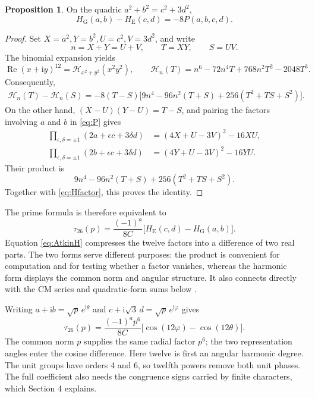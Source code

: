 \documentclass[a4paper,11pt]{article}
\theoremstyle{definition}
\newtheorem{proposition}{Proposition}[section]
\DeclareMathOperator{\Repart}{Re}
\newcommand{\iu}{\mathrm i}
\begin{document}
\begin{proposition}\label{prop:harmonic}
On the quadric \(a^2+b^2=c^2+3d^2\),
\begin{equation}\label{eq:harmonicidentity}
 H_{\mathrm G}(a,b)-H_{\mathrm E}(c,d)=-8P(a,b,c,d).
\end{equation}
\end{proposition}
\begin{proof}
Set \(X=a^2,Y=b^2,U=c^2,V=3d^2\), and write
\[
 n=X+Y=U+V,\qquad T=XY,\qquad S=UV.
\]
The binomial expansion yields
\begin{equation}\label{eq:F}
 \Repart(x+\iu y)^{12}
 =\mathcal H_{x^2+y^2}(x^2y^2),\qquad
 \mathcal H_n(T)=n^6-72n^4T+768n^2T^2-2048T^3 .
\end{equation}
Consequently,
\begin{align}
 \mathcal H_n(T)-\mathcal H_n(S)
 =-8(T-S)\bigl[
 9n^4-96n^2(T+S)+256(T^2+TS+S^2)
 \bigr].\label{eq:Hfactor}
\end{align}
On the other hand, \((X-U)(Y-U)=T-S\), and pairing the factors involving
\(a\) and \(b\) in \eqref{eq:P} gives
\begin{align*}
 \prod_{\epsilon,\delta=\pm1}(2a+\epsilon c+3\delta d)
 &=(4X+U-3V)^2-16XU,\\
 \prod_{\epsilon,\delta=\pm1}(2b+\epsilon c+3\delta d)
 &=(4Y+U-3V)^2-16YU.
\end{align*}
Their product is
\[
 9n^4-96n^2(T+S)+256(T^2+TS+S^2).
\]
Together with \eqref{eq:Hfactor}, this proves the identity.
\end{proof}

The prime formula is therefore equivalent to
\begin{equation}\label{eq:AtkinH}
 \tau_{26}(p)=\frac{(-1)^a}{8C}
       \bigl[H_{\mathrm E}(c,d)-H_{\mathrm G}(a,b)\bigr].
\end{equation}
Equation \eqref{eq:AtkinH} compresses the twelve factors into a difference
of two real parts. The two forms serve different purposes:
the product is convenient for computation and for testing whether a factor vanishes,
whereas the harmonic form displays the common norm and angular structure.
It also connects directly with the CM series and quadratic-form sums
below \cite{Serre1985,ChanCooperToh2006}.

Writing \(a+\iu b=\sqrt p\,e^{\iu\theta}\) and
\(c+\iu\sqrt3\,d=\sqrt p\,e^{\iu\varphi}\) gives
\begin{equation}\label{eq:angular}
 \tau_{26}(p)=\frac{(-1)^a p^6}{8C}
       \bigl[\cos(12\varphi)-\cos(12\theta)\bigr].
\end{equation}
The common norm \(p\) supplies the same radial factor \(p^6\);
the two representation angles enter the cosine difference.
Here twelve is first an angular harmonic degree.
The unit groups have orders 4 and 6, so twelfth powers remove both unit phases.
The full coefficient also needs the congruence signs carried by finite characters,
which Section 4 explains.
\end{document}

